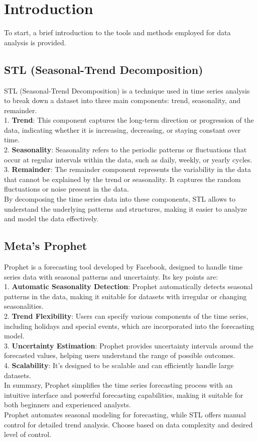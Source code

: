 \section{Introduction}
\noindent
To start, a brief introduction to the tools and methods employed for data analysis is provided.
\vspace{-15pt}

\subsection{STL (Seasonal-Trend Decomposition)}
STL (Seasonal-Trend Decomposition) is a technique used in time series analysis to break down a dataset into three main components: trend, seasonality, and remainder. \\
1. \textbf{Trend}: This component captures the long-term direction or progression of the data, indicating whether it is increasing, decreasing, or staying constant over time. \\
2. \textbf{Seasonality}: Seasonality refers to the periodic patterns or fluctuations that occur at regular intervals within the data, such as daily, weekly, or yearly cycles. \\
3. \textbf{Remainder}: The remainder component represents the variability in the data that cannot be explained by the trend or seasonality. It captures the random fluctuations or noise present in the data. \\
By decomposing the time series data into these components, STL allows to understand the underlying patterns and structures, making it easier to analyze and model the data effectively.

\vspace{-15pt}

\subsection{Meta's Prophet}
Prophet is a forecasting tool developed by Facebook, designed to handle time series data with seasonal patterns and uncertainty. Its key points are: \\
1. \textbf{Automatic Seasonality Detection}: Prophet automatically detects seasonal patterns in the data, making it suitable for datasets with irregular or changing seasonalities. \\
2. \textbf{Trend Flexibility}: Users can specify various components of the time series, including holidays and special events, which are incorporated into the forecasting model. \\
3. \textbf{Uncertainty Estimation}: Prophet provides uncertainty intervals around the forecasted values, helping users understand the range of possible outcomes. \\
4. \textbf{Scalability}: It's designed to be scalable and can efficiently handle large datasets. \\
In summary, Prophet simplifies the time series forecasting process with an intuitive interface and powerful forecasting capabilities, making it suitable for both beginners and experienced analysts. \\

Prophet automates seasonal modeling for forecasting, while STL offers manual control for detailed trend analysis. Choose based on data complexity and desired level of control.

